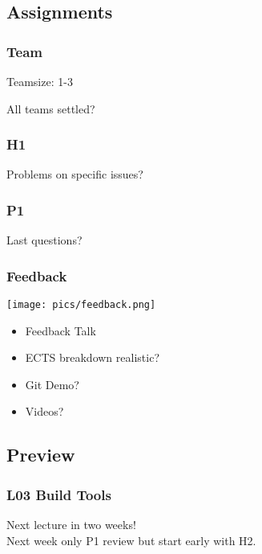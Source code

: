 \subsection{Assignments}

\begin{assignment}
	\frametitle{Team}
	Teamsize: 1-3

	\begin{task}
	All teams settled?
	\end{task}
\end{assignment}

\begin{assignment}
	\frametitle{H1}

	\begin{task}
	Problems on specific issues?
	\end{task}
\end{assignment}

\begin{assignment}
	\frametitle{P1}

	\begin{task}
	Last questions?
	\end{task}
\end{assignment}

\begin{frame}
	\frametitle{Feedback}

	\hfill \texttt{[image: pics/feedback.png]}
	\vspace{-1cm}
	\begin{itemize}
		\item Feedback Talk
		\item ECTS breakdown realistic?
		\item Git Demo?
		\item Videos?
	\end{itemize}
\end{frame}

\subsection{Preview}

\begin{frame}
	\frametitle{L03 Build Tools}

	\begin{warn}
	Next lecture in two weeks! \\
	Next week only P1 review but start early with H2.
	\end{warn}
\end{frame}



\nocite{raab2017introducing}

\appendix

\begin{frame}[allowframebreaks]
	
	
\end{frame}




